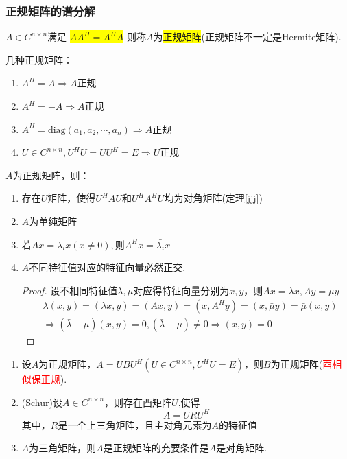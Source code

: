 \subsubsection{正规矩阵的谱分解}
\begin{definition}
$A\in C^{n\times n}$满足
\colorbox{yellow}{$ AA^H=A^HA  $}
则称$A$为\colorbox{yellow}{正规矩阵}(正规矩阵不一定是Hermite矩阵).
\end{definition}
\noindent 几种正规矩阵：
\begin{enumerate}
\item $A^H=A \Rightarrow$$A$正规
\item $A^H=-A \Rightarrow$$A$正规
\item $A^H=\mathrm{diag}(a_1,a_2,\cdots,a_n) \Rightarrow$$A$正规
\item $U\in C^{n\times n},U^HU=UU^H=E\Rightarrow U$正规
\end{enumerate}
\noindent $A$为正规矩阵，则：


\begin{enumerate}
	\item 存在$U$矩阵，使得$U^HAU$和$U^HA^HU$均为对角矩阵(定理\ref{jjj})
	\item $A$为单纯矩阵
	\item 若$Ax=\lambda_ix(x\ne 0),$则$A^Hx=\bar{\lambda_i}x$
	\item $A$不同特征值对应的特征向量必然正交.
	\begin{proof}
		设不相同特征值$\lambda,\mu$对应得特征向量分别为$x,y$，则$Ax=\lambda x,Ay=\mu y$
		\[\begin{split}
			&\bar{\lambda}(x,y)=(\lambda x,y)=(Ax,y)=(x,A^{H}y)=(x,\bar{\mu}y)=\bar{\mu}(x,y)\\
			&\Rightarrow (\bar{\lambda}-\bar{\mu})(x,y)=0,(\bar{\lambda}-\bar{\mu})\ne0 \Rightarrow(x,y)=0
		\end{split}
		\]
	\end{proof}
\end{enumerate}


\begin{lemma}
	\label{hhnnk}
\begin{enumerate}
\item 设$A$为正规矩阵，$A=UBU^H(U\in C^{n\times n},U^HU=E)$，则$B$为正规矩阵(\textcolor{red}{酉相似保正规}).
\item(Schur)设$A\in C^{n\times n}$，则存在酉矩阵$U$,使得
\[
A=URU^H
\]其中，$R$是一个上三角矩阵，且主对角元素为$A$的特征值
\item $A$为三角矩阵，则$A$是正规矩阵的充要条件是$A$是对角矩阵.
\end{enumerate}
\end{lemma}

